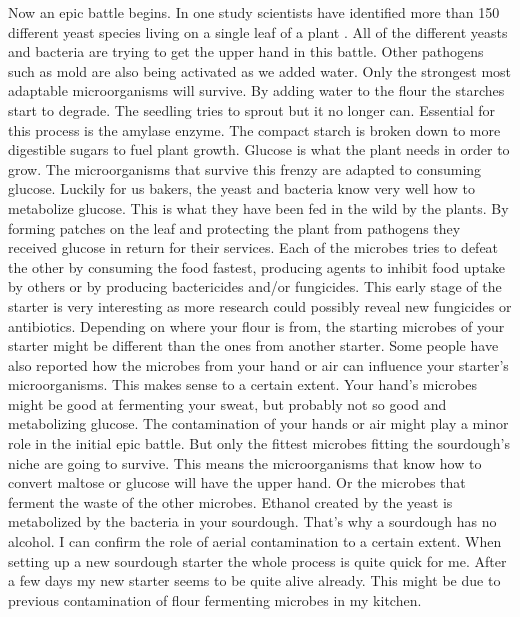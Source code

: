 Now an epic battle begins. In one study scientists
have identified more than 150 different yeast species living
on a single leaf of a plant \cite{yeasts+biocontrol+agent}.
All of the different yeasts and bacteria are trying to get
the upper hand in this battle. Other pathogens such as mold
are also being activated as we added water. Only the strongest
most adaptable microorganisms will survive. By adding water to the
flour the starches start to degrade. The seedling tries to
sprout but it no longer can. Essential for this process is the
amylase enzyme. The compact starch is broken down to more
digestible sugars to fuel plant growth. Glucose is what the
plant needs in order to grow. The microorganisms that survive
this frenzy are adapted to consuming glucose. Luckily for us
bakers, the yeast and bacteria know very well how to metabolize
glucose. This is what they have been fed in the wild by the plants.
By forming patches on the leaf and protecting the plant from
pathogens they received glucose in return for their services.
Each of the microbes tries to defeat the other by consuming the
food fastest, producing agents to inhibit food uptake by others or by producing
bactericides and/or fungicides. This early stage of the starter
is very interesting as more research could possibly reveal
new fungicides or antibiotics. Depending on where your flour
is from, the starting microbes of your starter might be different
than the ones from another starter. Some people have also reported
how the microbes from your hand or air can influence your starter's
microorganisms. This makes sense to a certain extent. Your
hand's microbes might be good at fermenting your sweat, but
probably not so good and metabolizing glucose. The contamination
of your hands or air might play a minor role in the initial epic
battle. But only the fittest microbes fitting the sourdough's
niche are going to survive. This means the microorganisms that know
how to convert maltose or glucose will have the upper hand. Or the
microbes that ferment the waste of the other microbes. Ethanol created
by the yeast is metabolized by the bacteria in your sourdough. That's
why a sourdough has no alcohol. I can confirm the role of aerial
contamination to a certain extent. When setting up a new sourdough
starter the whole process is quite quick for me. After a few
days my new starter seems to be quite alive already. This might
be due to previous contamination of flour fermenting microbes in
my kitchen.

